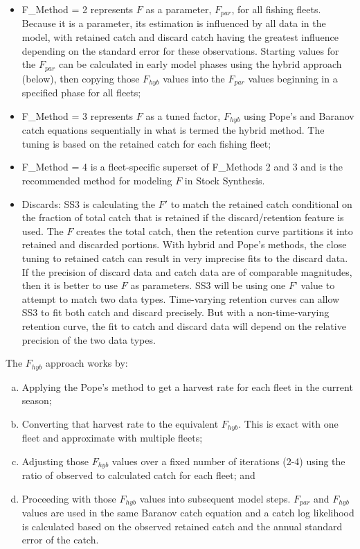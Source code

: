 \begin{itemize}
	\item F\_Method = 2 represents $F$ as a parameter, $F_{par}$, for all fishing fleets. Because it is a parameter, its estimation is influenced by all data in the model, with retained catch and discard catch having the greatest influence depending on the standard error for these observations. Starting values for the $F_{par}$ can be calculated in early model phases using the hybrid approach (below), then copying those $F_{hyb}$ values into the $F_{par}$ values beginning in a specified phase for all fleets;
	\item F\_Method = 3 represents $F$ as a tuned factor, $F_{hyb}$ using Pope's and Baranov catch equations sequentially in what is termed the hybrid method. The tuning is based on the retained catch for each fishing fleet;
	\item F\_Method = 4 is a fleet-specific superset of F\_Methods 2 and 3 and is the recommended method for modeling $F$ in Stock Synthesis.
	\item Discards: SS3 is calculating the $F'$ to match the retained catch conditional on the fraction of total catch that is retained if the discard/retention feature is used. The $F$ creates the total catch, then the retention curve partitions it into retained and discarded portions. With hybrid and Pope’s methods, the close tuning to retained catch can result in very imprecise fits to the discard data. If the precision of discard data and catch data are of comparable magnitudes, then it is better to use $F$ as parameters. SS3 will be using one $F’$ value to attempt to match two data types. Time-varying retention curves can allow SS3 to fit both catch and discard precisely. But with a non-time-varying retention curve, the fit to catch and discard data will depend on the relative precision of the two data types.
\end{itemize}

The $F_{hyb}$ approach works by:
\begin{enumerate}[a.]
	\item Applying the Pope’s method to get a harvest rate for each fleet in the current season;
	\item Converting that harvest rate to the equivalent $F_{hyb}$. This is exact with one fleet and approximate with multiple fleets;
	\item Adjusting those $F_{hyb}$ values over a fixed number of iterations (2-4) using the ratio of observed to calculated catch for each fleet; and
	\item Proceeding with those $F_{hyb}$ values into subsequent model steps. $F_{par}$ and $F_{hyb}$ values are used in the same Baranov catch equation and a catch log likelihood is calculated based on the observed retained catch and the annual standard error of the catch.
\end{enumerate}

